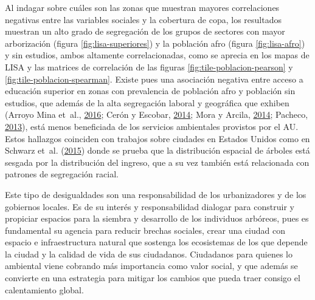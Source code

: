 \documentclass[12pt,a4paper,openany]{book}
\theoremstyle{definition}
\theoremstyle{definition}
\theoremstyle{definition}
\theoremstyle{remark}
\begin{document}
Al indagar sobre cuáles son las zonas que muestran mayores correlaciones
negativas entre las variables sociales y la cobertura de copa, los
resultados muestran un alto grado de segregación de los grupos de
sectores con mayor arborización (figura \ref{fig:lisa-superiores}) y la
población afro (figura \ref{fig:lisa-afro}) y sin estudios, ambos
altamente correlacionadas, como se aprecia en los mapas de LISA y las
matrices de correlación de las figuras \ref{fig:tile-poblacion-pearson}
y \ref{fig:tile-poblacion-spearman}. Existe pues una asociación negativa
entre acceso a educación superior en zonas con prevalencia de población
afro y población sin estudios, que además de la alta segregación laboral
y geográfica que exhiben (Arroyo Mina et~al.,
\protect\hyperlink{ref-arroyo_mina_afrocolombianos_2016}{2016}; Cerón y
Escobar, \protect\hyperlink{ref-ceron_indice_2014}{2014}; Mora y Arcila,
\protect\hyperlink{ref-mora_brechas_2014}{2014}; Pacheco,
\protect\hyperlink{ref-PACHECO2013121}{2013}), está menos beneficiada de
los servicios ambientales provistos por el AU. Estos hallazgos coinciden
con trabajos sobre ciudades en Estados Unidos como en Schwarz et~al.
(\protect\hyperlink{ref-schwarz_trees_2015}{2015}) donde se prueba que
la distribución espacial de árboles está sesgada por la distribución del
ingreso, que a su vez también está relacionada con patrones de
segregación racial.

Este tipo de desigualdades son una responsabilidad de los urbanizadores
y de los gobiernos locales. Es de su interés y responsabilidad dialogar
para construir y propiciar espacios para la siembra y desarrollo de los
individuos arbóreos, pues es fundamental su agencia para reducir brechas
sociales, crear una ciudad con espacio e infraestructura natural que
sostenga los ecosistemas de los que depende la ciudad y la calidad de
vida de sus ciudadanos. Ciudadanos para quienes lo ambiental viene
cobrando más importancia como valor social, y que además se convierte en
una estrategia para mitigar los cambios que pueda traer consigo el
calentamiento global.
\end{document}
